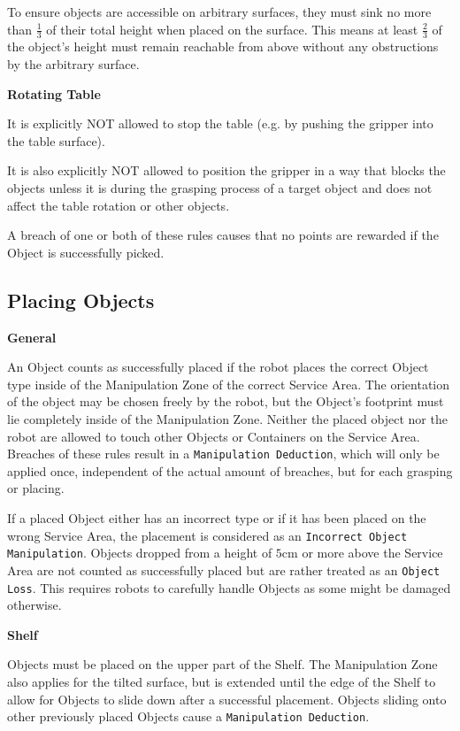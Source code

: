 To ensure objects are accessible on arbitrary surfaces, they must sink no more than $\frac{1}{3}$ of their total height when placed on the surface. This means at least $\frac{2}{3}$  of the object's height must remain reachable from above without any obstructions by the arbitrary surface.


\textbf{Rotating Table}

It is explicitly NOT allowed to stop the table (e.g. by pushing the gripper into the table surface).

It is also explicitly NOT allowed to position the gripper in a way that blocks the objects 
unless it is during the grasping process of a target object and does not affect the table rotation or other objects.

A breach of one or both of these rules causes that no points are rewarded if the Object is successfully picked.

\subsection{Placing Objects} \label{ssec:PlacingObjects}

\textbf{General}

An Object counts as successfully placed if the robot places the correct Object type inside of the Manipulation Zone of the correct Service Area. The orientation of the object may be chosen freely by the robot, but the Object's footprint must lie completely inside of the Manipulation Zone.
Neither the placed object nor the robot are allowed to touch other Objects or Containers on the Service Area.
Breaches of these rules result in a \texttt{Manipulation Deduction}, which will only be applied once, independent of the actual amount of breaches, but for each grasping or placing.

If a placed Object either has an incorrect type or if it has been placed on the wrong Service Area, 
the placement is considered as an \texttt{Incorrect Object Manipulation}. 
Objects dropped from a height of $5\si{\centi\meter}$ or more above the Service Area are not counted as successfully placed but are rather treated as an \texttt{Object Loss}. This requires robots to carefully handle Objects as some might be damaged otherwise.


\textbf{Shelf}

Objects must be placed on the upper part of the Shelf.
The Manipulation Zone also applies for the tilted surface, but is extended until the edge of the Shelf to allow for Objects to slide down after a successful placement. Objects sliding onto other previously placed Objects cause a \texttt{Manipulation Deduction}.


